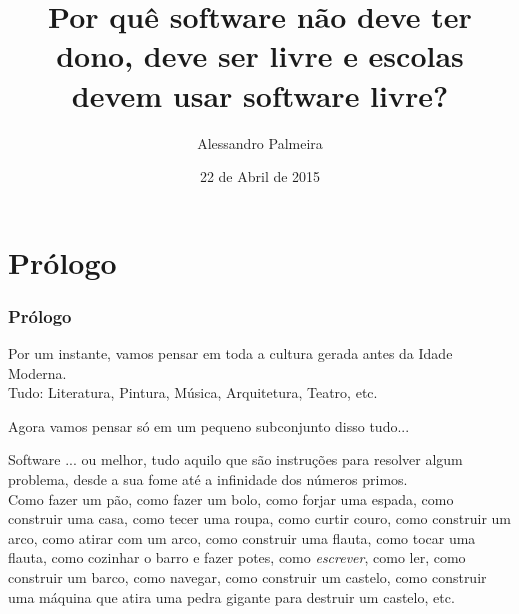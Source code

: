 \documentclass[serif,mathserif]{beamer}
\author[Alessandro Palmeira]{Alessandro Palmeira}
\title[Software Livre e Ensino\hspace{2em}\insertframenumber/\inserttotalframenumber]{Por quê software não deve ter dono, deve ser livre e escolas devem usar software livre?}
\date{22 de Abril de 2015} %
\institute{MAC0470 - Desenvolvimento de Software Livre}
\begin{document}
\maketitle

\section{Prólogo}  %

\begin{frame}
  \frametitle{Prólogo}
  Por um instante, vamos pensar em toda a cultura gerada antes da Idade Moderna.\pause\\
  Tudo: Literatura, Pintura, Música, Arquitetura, Teatro, etc.\pause
  
  \vspace{5mm} %
  Agora vamos pensar só em um pequeno subconjunto disso tudo...
\end{frame}

\begin{frame}
  Software\pause
  ... ou melhor, tudo aquilo que são instruções para resolver algum problema, desde a
  sua fome até a infinidade dos números primos.\pause\\
  Como fazer um pão, \pause como fazer um bolo, \pause como forjar uma espada, \pause como construir uma casa, \pause
  como tecer uma roupa, \pause como curtir couro, \pause como construir um arco, \pause como atirar com um arco, \pause
  como construir uma flauta, \pause como tocar uma flauta, \pause como cozinhar o barro e fazer potes, \pause
  como \emph{escrever}, \pause como ler, \pause como construir um barco, \pause como navegar, \pause como construir
  um castelo, \pause como construir uma máquina que atira uma pedra gigante para destruir
  um castelo, etc.
\end{frame}
\end{document}
